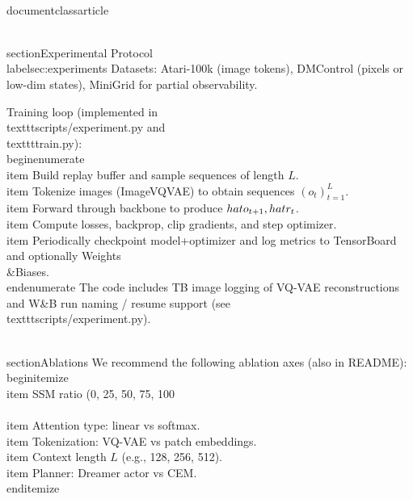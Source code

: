 \\documentclass{article}
\begin{document}
\\section{Experimental Protocol}
\\label{sec:experiments}
Datasets: Atari-100k (image tokens), DMControl (pixels or low-dim states), MiniGrid for partial observability.

Training loop (implemented in \\texttt{scripts/experiment.py} and \\texttt{train.py}):
\\begin{enumerate}
  \\item Build replay buffer and sample sequences of length $L$.
  \\item Tokenize images (ImageVQVAE) to obtain sequences $(o_t)_{t=1}^L$.
  \\item Forward through backbone to produce $\\hat o_{t+1}, \\hat r_t$.
  \\item Compute losses, backprop, clip gradients, and step optimizer.
  \\item Periodically checkpoint model+optimizer and log metrics to TensorBoard and optionally Weights\\&Biases.
\\end{enumerate}
The code includes TB image logging of VQ-VAE reconstructions and W&B run naming / resume support (see \\texttt{scripts/experiment.py}).

\\section{Ablations}
We recommend the following ablation axes (also in README):
\\begin{itemize}
  \\item SSM ratio (0, 25, 50, 75, 100\\%
  \\item Attention type: linear vs softmax.
  \\item Tokenization: VQ-VAE vs patch embeddings.
  \\item Context length $L$ (e.g., 128, 256, 512).
  \\item Planner: Dreamer actor vs CEM.
\\end{itemize}
\end{document}
